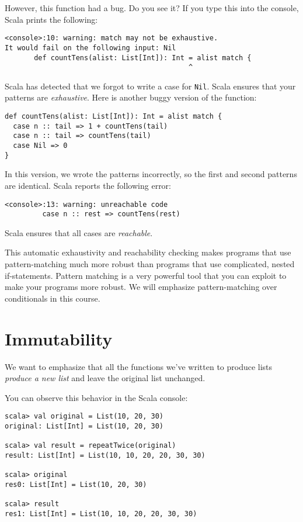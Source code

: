 \documentclass[9pt]{extbook}
\begin{document}
However, this function had a bug. Do you see it? If you type this into
the console, Scala prints the following:
%
\lstset{language=console}\begin{lstlisting}
<console>:10: warning: match may not be exhaustive.
It would fail on the following input: Nil
       def countTens(alist: List[Int]): Int = alist match {
                                            ^
\end{lstlisting}
%
Scala has detected that we forgot to write a case for \lstinline|Nil|.
Scala ensures that your patterns are \emph{exhaustive}. Here is another
buggy version of the function:
%
\lstset{language=scala}\begin{lstlisting}
def countTens(alist: List[Int]): Int = alist match {
  case n :: tail => 1 + countTens(tail)
  case n :: tail => countTens(tail)
  case Nil => 0
}
\end{lstlisting}
%
In this version, we wrote the patterns incorrectly, so the first and second
patterns are identical. Scala reports the following error:
\lstset{language=scala}\begin{lstlisting}
<console>:13: warning: unreachable code
         case n :: rest => countTens(rest)
\end{lstlisting}
%
Scala ensures that all cases are \emph{reachable}.

This automatic exhaustivity and reachability checking makes programs that
use pattern-matching much more robust than programs that use complicated,
nested if-statements. Pattern matching is a very powerful tool that you can
exploit to make your programs more robust. We will emphasize pattern-matching
over conditionals in this course.

\section{Immutability }

We want to emphasize that all the functions we've written to produce
lists \emph{produce a new list} and leave the original list unchanged.

You can observe this behavior in the Scala console:
%
\lstset{language=console}\begin{lstlisting}
scala> val original = List(10, 20, 30)
original: List[Int] = List(10, 20, 30)

scala> val result = repeatTwice(original)
result: List[Int] = List(10, 10, 20, 20, 30, 30)

scala> original
res0: List[Int] = List(10, 20, 30)

scala> result
res1: List[Int] = List(10, 10, 20, 20, 30, 30)
\end{lstlisting}
\end{document}
